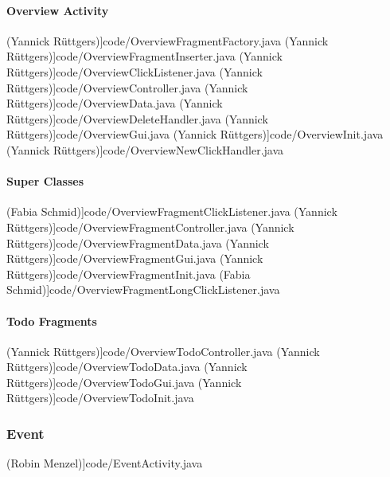 		\paragraph{Overview Activity}
 (Yannick Rüttgers)]{code/OverviewFragmentFactory.java}
 (Yannick Rüttgers)]{code/OverviewFragmentInserter.java}
 (Yannick Rüttgers)]{code/OverviewClickListener.java}
 (Yannick Rüttgers)]{code/OverviewController.java}
 (Yannick Rüttgers)]{code/OverviewData.java}
 (Yannick Rüttgers)]{code/OverviewDeleteHandler.java}
 (Yannick Rüttgers)]{code/OverviewGui.java}
 (Yannick Rüttgers)]{code/OverviewInit.java}
 (Yannick Rüttgers)]{code/OverviewNewClickHandler.java}
		\paragraph{Super Classes}
 (Fabia Schmid)]{code/OverviewFragmentClickListener.java}
 (Yannick Rüttgers)]{code/OverviewFragmentController.java}
 (Yannick Rüttgers)]{code/OverviewFragmentData.java}
 (Yannick Rüttgers)]{code/OverviewFragmentGui.java}
 (Yannick Rüttgers)]{code/OverviewFragmentInit.java}
 (Fabia Schmid)]{code/OverviewFragmentLongClickListener.java}
		\paragraph{Todo Fragments}
 (Yannick Rüttgers)]{code/OverviewTodoController.java}
 (Yannick Rüttgers)]{code/OverviewTodoData.java}
 (Yannick Rüttgers)]{code/OverviewTodoGui.java}
 (Yannick Rüttgers)]{code/OverviewTodoInit.java}
	\subsubsection{Event}
 (Robin Menzel)]{code/EventActivity.java}
